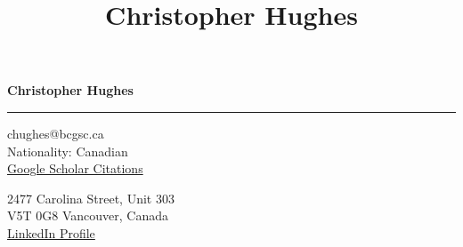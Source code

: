\documentclass[11pt]{article}
\title{\bfseries\Huge Christopher Hughes}
\author{}
\date{}
\begin{document}
	\newpage
	\setcounter{page}{1}
	\noindent

\begin{LARGE}

	\noindent\textbf{Christopher Hughes}\vspace{1pt}

\end{LARGE}


\noindent\rule{\textwidth}{1pt}\vspace{9pt}

\noindent
\begin{minipage}{0.5\textwidth}
	\begin{flushleft}
		chughes@bcgsc.ca\\
		Nationality: Canadian\\ \href{https://scholar.google.com/citations?user=jPSwBGwAAAAJ}{Google Scholar Citations}
	\end{flushleft}
\end{minipage}%
\begin{minipage}{0.5\textwidth}
	\begin{flushright}
		2477 Carolina Street, Unit 303\\
		V5T 0G8 Vancouver, Canada\\ \href{https://www.linkedin.com/in/christopher-hughes-612460133/}{LinkedIn Profile}
	\end{flushright}
\end{minipage}\vspace{6pt}
\end{document}
